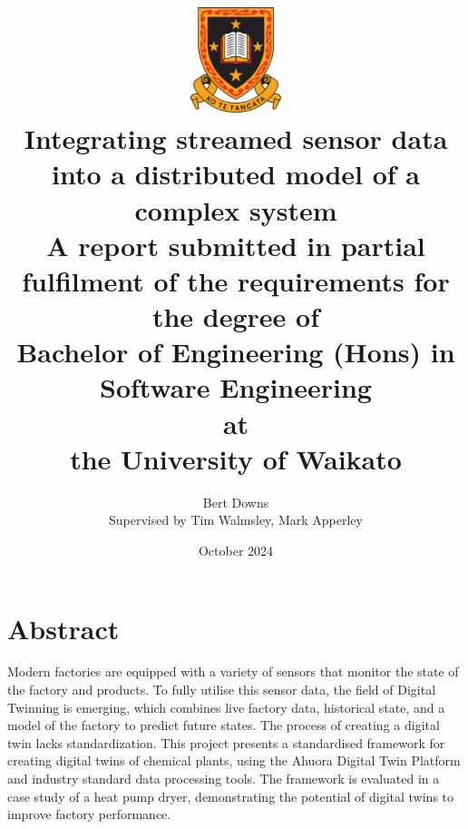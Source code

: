 \documentclass[12pt]{report}
\title{ \includegraphics[width=0.2\textwidth]{uow_logo.png} \\
Integrating streamed sensor data into a distributed model of a complex system \\
\large{A report submitted in partial fulfilment of the requirements for the degree of \\
\textbf{Bachelor of Engineering (Hons) in Software Engineering} \\
at \\
\textbf{the University of Waikato}\\
}}
\author{Bert Downs  \\ 
Supervised by Tim Walmsley, Mark Apperley }
\date{October 2024}
\begin{document}


\maketitle


\chapter*{Abstract}

Modern factories are equipped with a variety of sensors that monitor the state of the factory and products. To fully utilise this sensor data, the field of Digital Twinning is emerging, which combines live factory data, historical state, and a model of the factory to predict future states. The process of creating a digital twin lacks standardization. This project presents a standardised framework for creating digital twins of chemical plants, using the Ahuora Digital Twin Platform and industry standard data processing tools. The framework is evaluated in a case study of a heat pump dryer, demonstrating the potential of digital twins to improve factory performance.
\end{document}
